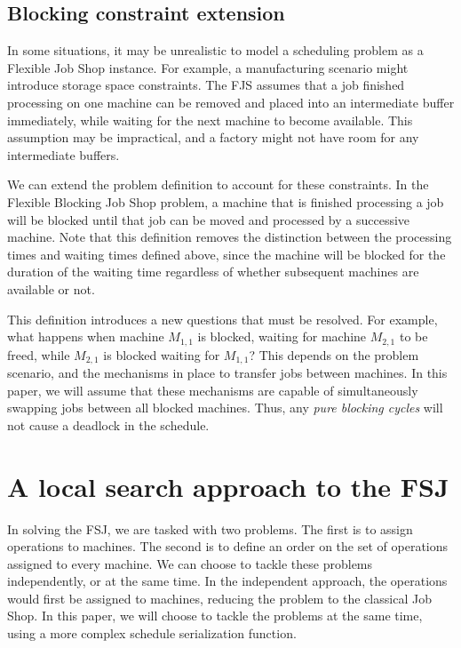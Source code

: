 \documentclass[a4paper,11pt]{article}
\begin{document}
\subsection{Blocking constraint extension}

In some situations, it may be unrealistic to model a scheduling problem as a Flexible Job Shop instance. For example, a manufacturing scenario might introduce storage space constraints. The FJS assumes that a job finished processing on one machine can be removed and placed into an intermediate buffer immediately, while waiting for the next machine to become available. This assumption may be impractical, and a factory might not have room for any intermediate buffers.

We can extend the problem definition to account for these constraints. In the Flexible Blocking Job Shop problem, a machine that is finished processing a job will be blocked until that job can be moved and processed by a successive machine. Note that this definition removes the distinction between the processing times and waiting times defined above, since the machine will be blocked for the duration of the waiting time regardless of whether subsequent machines are available or not.

This definition introduces a new questions that must be resolved. For example, what happens when machine $M_{1,1}$ is blocked, waiting for machine $M_{2,1}$ to be freed, while $M_{2,1}$ is blocked waiting for $M_{1,1}$? This depends on the problem scenario, and the mechanisms in place to transfer jobs between machines. In this paper, we will assume that these mechanisms are capable of simultaneously swapping jobs between all blocked machines. Thus, any \emph{pure blocking cycles} will not cause a deadlock in the schedule.

\section{A local search approach to the FSJ}

In solving the FSJ, we are tasked with two problems. The first is to assign operations to machines. The second is to define an order on the set of operations assigned to every machine. We can choose to tackle these problems independently, or at the same time. In the independent approach, the operations would first be assigned to machines, reducing the problem to the classical Job Shop. In this paper, we will choose to tackle the problems at the same time, using a more complex schedule serialization function.
\end{document}
